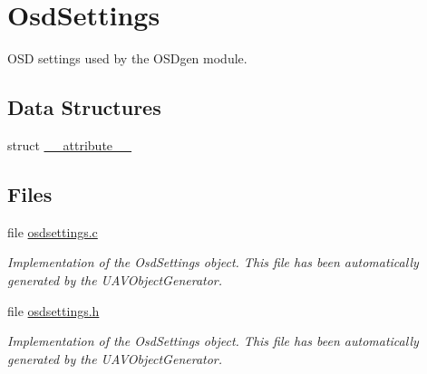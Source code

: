 \hypertarget{group___osd_settings}{\section{\-Osd\-Settings}
\label{group___osd_settings}
}


\-O\-S\-D settings used by the \-O\-S\-Dgen module.  


\subsection*{\-Data \-Structures}
\begin{DoxyCompactItemize}
\item 
struct \hyperlink{struct____attribute____}{\-\_\-\-\_\-attribute\-\_\-\-\_\-}
\end{DoxyCompactItemize}
\subsection*{\-Files}
\begin{DoxyCompactItemize}
\item 
file \hyperlink{osdsettings_8c}{osdsettings.\-c}
\begin{DoxyCompactList}\small\item\em \-Implementation of the \-Osd\-Settings object. \-This file has been automatically generated by the \-U\-A\-V\-Object\-Generator. \end{DoxyCompactList}\item 
file \hyperlink{osdsettings_8h}{osdsettings.\-h}
\begin{DoxyCompactList}\small\item\em \-Implementation of the \-Osd\-Settings object. \-This file has been automatically generated by the \-U\-A\-V\-Object\-Generator. \end{DoxyCompactList}\end{DoxyCompactItemize}

